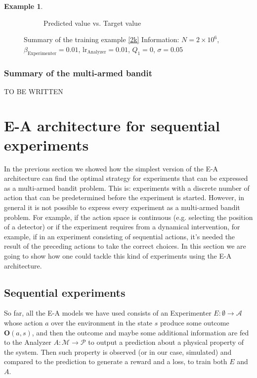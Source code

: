 \documentclass[11pt,a4paper,twoside]{report}
\newcommand{\+}{\textnormal{+} }
\theoremstyle{definition}
\newtheorem{myex}[mythm]{Example}
\numberwithin{equation}{chapter}
\begin{document}
\begin{myex}
\begin{figure}[]
\begin{subfigure}{.5\textwidth}
        \caption{Predicted value vs. Target value}
        \label{fig:actionsMAB6}
      \end{subfigure}
      \caption{ Summary of the training example \eqref{2k}
         Information: $N=2\times10^6$,
      $\beta_\text{Experimenter}=0.01$, $\text{lr}_\text{Analyzer}=0.01$,
      $Q_1=0$, $\sigma=0.05$}
    \end{figure}
  \end{myex}

  \subsection{Summary of the multi-armed bandit}
  TO BE WRITTEN



\chapter{E-A architecture for sequential experiments}

In the previous section we showed how the simplest version of the
E-A architecture can find the optimal strategy for experiments that can be
expressed as a multi-armed bandit problem. This is: experiments with a discrete
number of action that can be predetermined before the experiment is started.
However, in general it is not possible to express every experiment as a 
multi-armed bandit problem. For example, if the action space is continuous 
(e.g. selecting the position of a detector) or if the experiment 
requires from a dynamical intervention, for example, if in an experiment
consisting of sequential actions, it's needed the result of 
the preceding actions to take the correct choices. In this section we are going
to show how one could tackle this kind of experiments using the E-A 
architecture. 

\section{Sequential experiments}

So far, all the E-A models we have used consists of an Experimenter $E:\emptyset
\rightarrow \mathcal{A}$ whose action $a$ over the environment in the state $s$
produce some outcome $\textbf{O}(a,s)$, and then the outcome and maybe some
additional information are fed to the Analyzer $A:\mathcal{M} \rightarrow
\mathcal{P}$ to output a prediction about a physical property of the system.
Then such property is observed (or in our case, simulated) and compared to the
prediction to generate a reward and a loss, to train both $E$ and $A$. 
\end{document}
